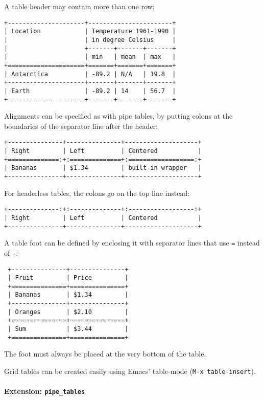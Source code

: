 A table header may contain more than one row:

\begin{verbatim}
+---------------------+-----------------------+
| Location            | Temperature 1961-1990 |
|                     | in degree Celsius     |
|                     +-------+-------+-------+
|                     | min   | mean  | max   |
+=====================+=======+=======+=======+
| Antarctica          | -89.2 | N/A   | 19.8  |
+---------------------+-------+-------+-------+
| Earth               | -89.2 | 14    | 56.7  |
+---------------------+-------+-------+-------+
\end{verbatim}

Alignments can be specified as with pipe tables, by putting colons at
the boundaries of the separator line after the header:

\begin{verbatim}
+---------------+---------------+--------------------+
| Right         | Left          | Centered           |
+==============:+:==============+:==================:+
| Bananas       | $1.34         | built-in wrapper   |
+---------------+---------------+--------------------+
\end{verbatim}

For headerless tables, the colons go on the top line instead:

\begin{verbatim}
+--------------:+:--------------+:------------------:+
| Right         | Left          | Centered           |
+---------------+---------------+--------------------+
\end{verbatim}

A table foot can be defined by enclosing it with separator lines that
use \texttt{=} instead of \texttt{-}:

\begin{verbatim}
 +---------------+---------------+
 | Fruit         | Price         |
 +===============+===============+
 | Bananas       | $1.34         |
 +---------------+---------------+
 | Oranges       | $2.10         |
 +===============+===============+
 | Sum           | $3.44         |
 +===============+===============+
\end{verbatim}

The foot must always be placed at the very bottom of the table.

Grid tables can be created easily using Emacs' table-mode
(\texttt{M-x\ table-insert}).

\hypertarget{extension-pipe_tables}{%
\paragraph{\texorpdfstring{Extension:
\texttt{pipe\_tables}}{Extension: pipe\_tables}}\label{extension-pipe_tables}}

